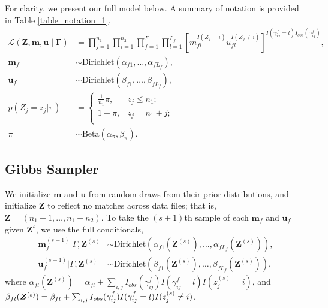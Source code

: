 \documentclass[ba]{imsart}
\begin{document}
For clarity, we present our full model below. A summary of notation is provided in Table \ref{table_notation_1}.
\begin{subequations}
\begin{align}
	\mathcal{L}(\bm{Z}, \bm{m}, \bm{u} \mid \bm{\Gamma}) &= \prod_{j=1}^{n_1}  \prod_{i=1}^{n_2}\prod_{f=1}^{F}\prod_{l=1}^{L_f}\left[  m_{fl}^{I(Z_j = i)}u_{fl}^{I(Z_j \neq i)}\right]^{I(\gamma_{ij}^f = l)I_{obs}(\gamma_{ij}^f)}, \label{eqn:likelihood}\\
	\bm{m}_f &\sim \text{Dirichlet}(\alpha_{f1}, \ldots, \alpha_{f L_f}), \label{eqn:m} \\
	\bm{u}_f &\sim \text{Dirichlet}(\beta_{f1}, \ldots, \beta_{f L_f}), \label{eqn:u}\\
	p(Z_j = z_j| \pi)  &=
	\begin{cases} 
		\frac{1}{n_1}\pi,  & z_j \leq n_1; \\
		1-\pi, &  z_j  = n_1 + j; \\
	\end{cases} \label{eqn:z}\\
	\pi &\sim \text{Beta}(\alpha_{\pi}, \beta_{\pi})\label{eqn:pi}.
\end{align}
\end{subequations}


\hypertarget{posterior-sampling}{%
	\subsection{Gibbs Sampler}
	\label{gibbs_sampling}}

We initialize $\bm{m}$ and $\bm{u}$ from random draws from their prior distributions, and initialize $\bm{Z}$ to reflect no matches across data files; that is, $\bm{Z} = (n_1 + 1, \ldots, n_1 + n_2)$. To take the $(s+1)$th sample of each $\bm{m}_f$ and $\bm{u}_f$ given $\bm{Z}^s$, we use the full conditionals,
\begin{subequations}
\begin{align}
	\bm{m}_f^{(s+1)}|\Gamma, \bm{Z}^{(s)} &\sim \text{Dirichlet}(\alpha_{f1}(\bm{Z}^{(s)}), \ldots, \alpha_{fL_f}(\bm{Z}^{(s)})), \label{eqn:m_update} \\
	\bm{u}_f^{(s+1)}|\Gamma, \bm{Z}^{(s)} &\sim \text{Dirichlet}(\beta_{f1}(\bm{Z}^{(s)}), \ldots, \beta_{fL_f}(\bm{Z}^{(s)})), \label{eqn:u_update}
\end{align}
\end{subequations}
where $\alpha_{fl}(\bm{Z}^{(s)})= \alpha_{fl} + \sum_{i,j} I_{obs}(\gamma_{ij}^f) I(\gamma_{ij}^f = l) I(z_j^{(s)} = i)$, and $\beta_{fl}(\bm{Z}^{(s)})= \\ \beta_{fl} + \sum_{i,j} I_{obs}(\gamma_{ij}^f) I(\gamma_{ij}^f = l) I(z_j^{(s)} \neq i)$.
\end{document}

